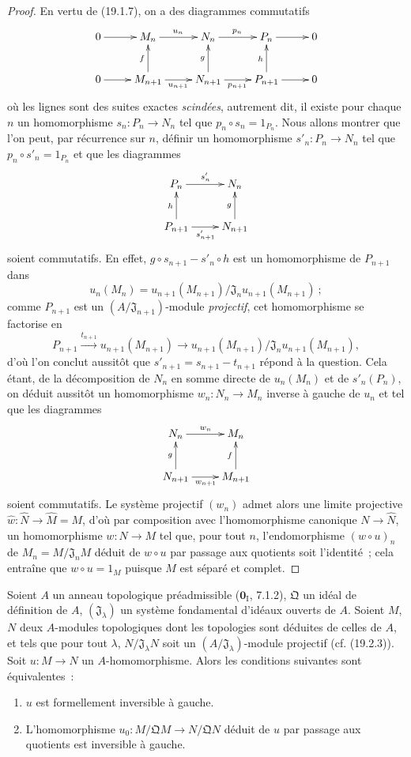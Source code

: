 \begin{proof}
En vertu de (19.1.7), on a des diagrammes commutatifs
\[
  \xymatrix{
    0\ar[r] & M_n\ar[r]^{u_n} & N_n\ar[r]^{p_n} & P_n\ar[r] & 0\\
    0\ar[r] & M_{n+1}\ar[u]^f\ar[r]_{u_{n+1}} &
      N_{n+1}\ar[u]^g\ar[r]_{p_{n+1}} & P_{n+1}\ar[u]^h\ar[r] & 0
  }
\]
où les lignes sont des suites exactes \emph{scindées}, autrement dit, il existe
pour chaque $n$ un homomorphisme $s_n:P_n\to N_n$ tel que
$p_n\circ s_n=1_{P_n}$. Nous allons montrer que l'on peut, par récurrence sur
$n$, définir un homomorphisme $s'_n:P_n\to N_n$ tel que
$p_n\circ s'_n=1_{P_n}$ et que les diagrammes
\[
  \xymatrix{
    P_n\ar[r]^{s'_n} & N_n\\
    P_{n+1}\ar[u]^h\ar[r]_{s'_{n+1}} & N_{n+1}\ar[u]^g
  }
\]
soient commutatifs. En effet, $g\circ s_{n+1}-s'_n\circ h$ est un
homomorphisme de $P_{n+1}$ dans
\[
  u_n(M_n)=u_{n+1}(M_{n+1})/
  \mathfrak J_nu_{n+1}(M_{n+1})~;
\]
comme $P_{n+1}$ est un $(A/\mathfrak J_{n+1})$-module \emph{projectif}, cet
homomorphisme se factorise en
\[
  P_{n+1}\xrightarrow{t_{n+1}}u_{n+1}(M_{n+1})
  \longrightarrow
  u_{n+1}(M_{n+1})/\mathfrak J_nu_{n+1}(M_{n+1}),
\]
d'où l'on conclut aussitôt que $s'_{n+1}=s_{n+1}-t_{n+1}$ répond à la
question. Cela étant, de la décomposition de $N_n$ en somme directe de
$u_n(M_n)$ et de $s'_n(P_n)$, on déduit aussitôt un homomorphisme
$w_n:N_n\to M_n$ inverse à gauche de $u_n$ et tel que les diagrammes
\[
  \xymatrix{
    N_n\ar[r]^{w_n} & M_n\\
    N_{n+1}\ar[u]^g\ar[r]_{w_{n+1}} & M_{n+1}\ar[u]^f
  }
\]
soient commutatifs. Le système projectif $(w_n)$ admet alors une limite
projective $\widehat w:\widehat N\to\widehat M=M$, d'où par composition avec
l'homomorphisme canonique $N\to\widehat N$, un homomorphisme $w:N\to M$ tel
que, pour tout $n$, l'endomorphisme $(w\circ u)_n$ de
$M_n=M/\mathfrak J_nM$ déduit de $w\circ u$ par passage aux quotients soit
l'identité~; cela entraîne que $w\circ u=1_M$ puisque $M$ est séparé et
complet.
\end{proof}

\begin{proposition}[19.1.9]
\label{0.19.1.9-fr}
Soient $A$ un anneau topologique préadmissible ($\mathbf{0}_{\mathrm I}$,
7.1.2), $\mathfrak Q$ un idéal de définition de $A$,
$(\mathfrak J_\lambda)$ un système fondamental d'idéaux ouverts de $A$.
Soient $M$, $N$ deux $A$-modules topologiques dont les topologies sont déduites
de celles de $A$, et tels que pour tout $\lambda$,
$N/\mathfrak J_\lambda N$ soit un $(A/\mathfrak J_\lambda)$-module projectif
(cf. (19.2.3)). Soit $u:M\to N$ un $A$-homomorphisme. Alors les conditions
suivantes sont équivalentes~:
\begin{enumerate}
  \item[a)] $u$ est formellement inversible à gauche.


  \item[b)] L'homomorphisme
  $u_0:M/\mathfrak QM\to N/\mathfrak QN$ déduit de $u$ par passage aux
  quotients est inversible à gauche.
\end{enumerate}
\end{proposition}

